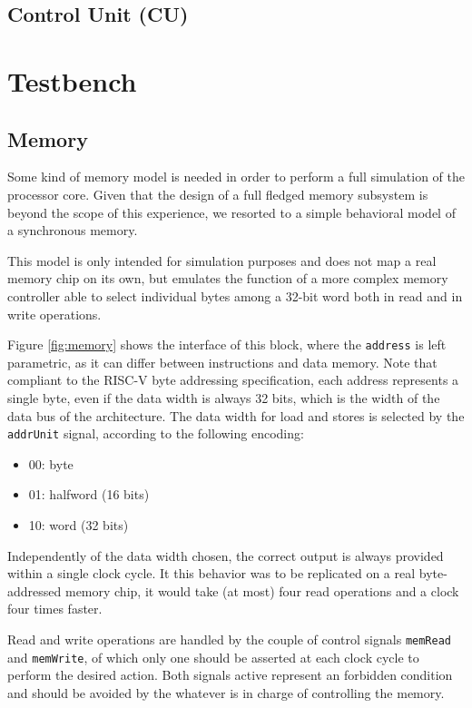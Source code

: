 \documentclass[a4paper]{article}
\begin{document}
\subsection{Control Unit (CU)}


\section{Testbench}
\subsection{Memory}\label{sec:memory}
Some kind of memory model is needed in order to perform a full simulation of the processor core. Given that the design of a full fledged memory subsystem is beyond the scope of this experience, we resorted to a simple behavioral model of a synchronous memory.

This model is only intended for simulation purposes and does not map a real memory chip on its own, but emulates the function of a more complex memory controller able to select individual bytes among a 32-bit word both in read and in write operations.

Figure \ref{fig:memory} shows the interface of this block, where the \texttt{address} is left parametric, as it can differ between instructions and data memory. Note that compliant to the RISC-V byte addressing specification, each address represents a single byte, even if the data width is always 32 bits, which is the width of the data bus of the architecture. The data width for load and stores is selected by the \texttt{addrUnit} signal, according to the following encoding:
\begin{itemize}
    \item 00: byte
    \item 01: halfword (16 bits)
    \item 10: word (32 bits)
\end{itemize}
Independently of the data width chosen, the correct output is always provided within a single clock cycle. It this behavior was to be replicated on a real byte-addressed memory chip, it would take (at most) four read operations and a clock four times faster.

Read and write operations are handled by the couple of control signals \texttt{memRead} and \texttt{memWrite}, of which only one should be asserted at each clock cycle to perform the desired action. Both signals active represent an forbidden condition and should be avoided by the whatever is in charge of controlling the memory.
\end{document}
